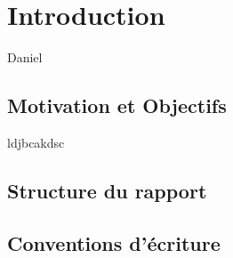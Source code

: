 \chapter[Introduction]{Introduction}
Daniel
\newpage
\section[Motivations et objectifs]{Motivation et Objectifs}
ldjbcakdsc

\section[Structure du rapport]{Structure du rapport}

\section[Table des symoles]{Conventions d'écriture}